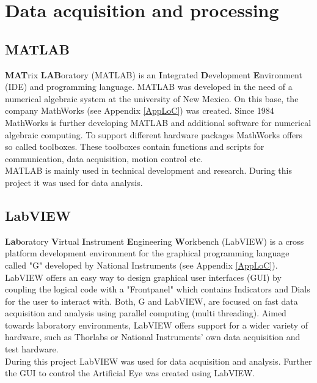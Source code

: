\section{Data acquisition and processing}
\subsection{MATLAB}
\textbf{MAT}rix \textbf{LAB}oratory (MATLAB) is an \textbf{I}ntegrated \textbf{D}evelopment \textbf{E}nvironment (IDE) and programming language. MATLAB was developed in the need of a numerical algebraic system at the university of New Mexico. On this base, the company MathWorks (see Appendix \ref{AppLoC}) was created. Since 1984 MathWorks is further developing MATLAB and additional software for numerical algebraic computing. To support different hardware packages MathWorks offers so called toolboxes. These toolboxes contain functions and scripts for communication, data acquisition, motion control etc.\cite{Mathworks}\\
MATLAB is mainly used in technical development and research. During this project it was used for data analysis.

\subsection{LabVIEW}
\textbf{Lab}oratory \textbf{V}irtual \textbf{I}nstrument \textbf{E}ngineering \textbf{W}orkbench (LabVIEW) is a cross platform development environment for the graphical programming language called "G" developed by National Instruments (see Appendix \ref{AppLoC}). LabVIEW offers an easy way to design graphical user interfaces (GUI) by coupling the logical code with a "Frontpanel" which contains Indicators and Dials for the user to interact with. Both, G and LabVIEW, are focused on fast data acquisition and analysis using parallel computing (multi threading). Aimed towards laboratory environments, LabVIEW offers support for a wider variety of hardware, such as Thorlabs or National Instruments' own data acquisition and test hardware.\cite{whatisLabVIEW}\\
During this project LabVIEW was used for data acquisition and analysis. Further the GUI to control the Artificial Eye was created using LabVIEW.

















